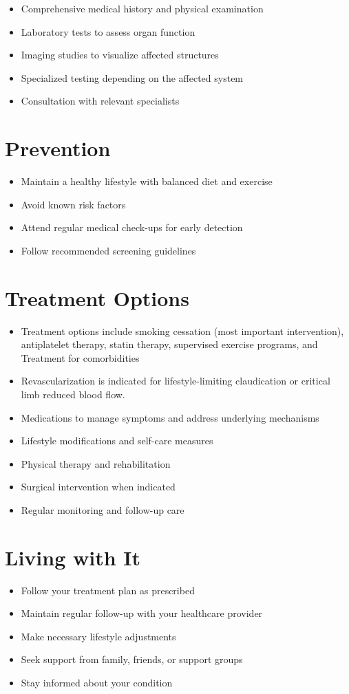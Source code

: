 \begin{itemize}[noitemsep]
  \item Comprehensive medical history and physical examination
  \item Laboratory tests to assess organ function
  \item Imaging studies to visualize affected structures
  \item Specialized testing depending on the affected system
  \item Consultation with relevant specialists
\end{itemize}
\section{Prevention}
\begin{itemize}[noitemsep]
  \item Maintain a healthy lifestyle with balanced diet and exercise
  \item Avoid known risk factors
  \item Attend regular medical check-ups for early detection
  \item Follow recommended screening guidelines
\end{itemize}
\section{Treatment Options}
\begin{itemize}[noitemsep]
  \item Treatment options include smoking cessation (most important intervention), antiplatelet therapy, statin therapy, supervised exercise programs, and Treatment for comorbidities
  \item Revascularization is indicated for lifestyle-limiting claudication or critical limb reduced blood flow.
  \item Medications to manage symptoms and address underlying mechanisms
  \item Lifestyle modifications and self-care measures
  \item Physical therapy and rehabilitation
  \item Surgical intervention when indicated
  \item Regular monitoring and follow-up care
\end{itemize}
\section{Living with It}
\begin{itemize}[noitemsep]
  \item Follow your treatment plan as prescribed
  \item Maintain regular follow-up with your healthcare provider
  \item Make necessary lifestyle adjustments
  \item Seek support from family, friends, or support groups
  \item Stay informed about your condition
\end{itemize}

